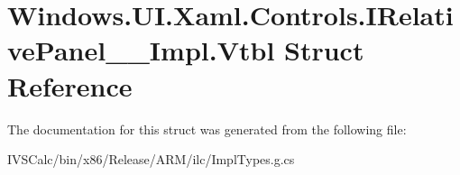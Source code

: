 \hypertarget{struct_windows_1_1_u_i_1_1_xaml_1_1_controls_1_1_i_relative_panel_____impl_1_1_vtbl}{}\section{Windows.\+U\+I.\+Xaml.\+Controls.\+I\+Relative\+Panel\+\_\+\+\_\+\+Impl.\+Vtbl Struct Reference}
\label{struct_windows_1_1_u_i_1_1_xaml_1_1_controls_1_1_i_relative_panel_____impl_1_1_vtbl}


The documentation for this struct was generated from the following file\+:\begin{DoxyCompactItemize}
\item 
I\+V\+S\+Calc/bin/x86/\+Release/\+A\+R\+M/ilc/Impl\+Types.\+g.\+cs\end{DoxyCompactItemize}

